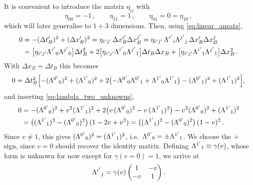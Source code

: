 It is convenient to introduce the matrix $\eta_{ij}$ with
\begin{equation}
    \eta_{00} = -1 \, , \qquad \eta_{11} = 1 \, , \qquad \eta_{01} = 0 = \eta_{10} \, ,
    \label{eq:eta}
\end{equation}
which will later generalise to $1+3$ dimensions. Then, using \eqref{eq:linear_ansatz},
\begin{align}
    0 & = -(\Delta t'_B)^2 + (\Delta x'_B)^2
    = \eta_{i'j'}\, \Delta x_B^{i'} \Delta x_B^{j'}
    = \eta_{i'j'}\, \Lambda^{i'}{}_{i} \Lambda^{j'}{}_{j}\, \Delta x_B^{i} \Delta x_B^{j} \nonumber \\
      & = \bigl[\eta_{i'j'} \Lambda^{i'}{}_{0} \Lambda^{j'}{}_{0}\bigr] \Delta t_B^2
    + 2 \bigl[\eta_{i'j'} \Lambda^{i'}{}_{0} \Lambda^{j'}{}_{1}\bigr] \Delta t_B \Delta x_B
    + \bigl[\eta_{i'j'} \Lambda^{i'}{}_{1} \Lambda^{j'}{}_{1}\bigr] \Delta x_B^2 \, .
\end{align}
With $\Delta x_B = \Delta t_B$ this becomes
\begin{equation}
    0 = \Delta t_B^2 \Bigl[ -(\Lambda^{0'}{}_{0})^2 + (\Lambda^{1'}{}_{0})^2
        + 2\bigl(-\Lambda^{0'}{}_{0}\Lambda^{0'}{}_{1} + \Lambda^{1'}{}_{0}\Lambda^{1'}{}_{1}\bigr)
        - (\Lambda^{0'}{}_{1})^2 + (\Lambda^{1'}{}_{1})^2 \Bigr] ,
\end{equation}
and inserting \eqref{eq:lambda_two_unknowns},
\begin{align}
    0 & = -(\Lambda^{0'}{}_{0})^2 + v^2 (\Lambda^{1'}{}_{1})^2
    + 2\bigl(v\,(\Lambda^{0'}{}_{0})^2 - v\,(\Lambda^{1'}{}_{1})^2\bigr)
    - v^2 (\Lambda^{0'}{}_{0})^2 + (\Lambda^{1'}{}_{1})^2 \nonumber \\
      & = \bigl((\Lambda^{1'}{}_{1})^2 - (\Lambda^{0'}{}_{0})^2\bigr)\,(1 - 2v + v^2)
    = \bigl((\Lambda^{1'}{}_{1})^2 - (\Lambda^{0'}{}_{0})^2\bigr)\,(1 - v)^2 \, .
\end{align}
Since $v \neq 1$, this gives $(\Lambda^{0'}{}_{0})^2 = (\Lambda^{1'}{}_{1})^2$, i.e.\
$\Lambda^{0'}{}_{0} = \pm \Lambda^{1'}{}_{1}$. We choose the $+$ sign, since $v = 0$ should recover the identity
matrix. Defining $\Lambda^{1'}{}_{1} \equiv \gamma(v)$, whose form is unknown for now except for
$\gamma(v = 0) = 1$, we arrive at
\begin{equation}
    \Lambda^{i'}{}_{j} = \gamma(v) \begin{pmatrix} 1 & -v \\ -v & 1 \end{pmatrix} .
    \label{eq:lambda_gamma}
\end{equation}


